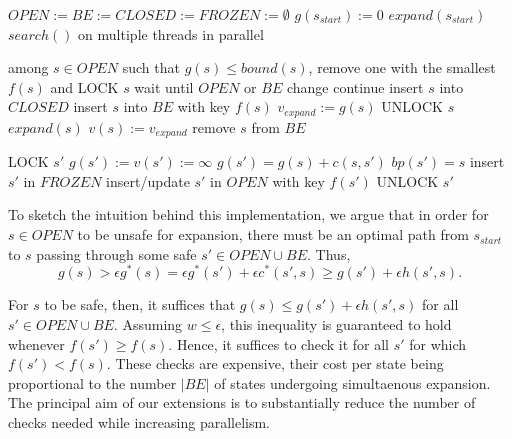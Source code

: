 \documentclass[letterpaper]{article}
\begin{document}
\begin{algorithm}
\caption{$main()$}
\label{alg:main}
\begin{algorithmic}
\STATE $OPEN := BE := CLOSED := FROZEN := \emptyset$
\STATE $g(s_{start}) := 0$
\STATE $expand(s_{start})$
\STATE $search()$ on multiple threads in parallel
\end{algorithmic}
\end{algorithm}

\begin{algorithm}
\caption{$search()$}
\label{alg:search}
\begin{algorithmic}
\STATE among $s\in OPEN$ such that $g(s) \le bound(s)$, remove one with the smallest $f(s)$ and LOCK $s$
\STATE wait until $OPEN$ or $BE$ change
\STATE continue
\ENDIF
\STATE insert $s$ into $CLOSED$
\STATE insert $s$ into $BE$ with key $f(s)$
\STATE $v_{expand} := g(s)$
\STATE UNLOCK $s$
\STATE $expand(s)$
\STATE $v(s) := v_{expand}$
\STATE remove $s$ from $BE$
\ENDWHILE
\end{algorithmic}
\end{algorithm}

\begin{algorithm}
\caption{$expand(s)$}
\label{alg:expand}
\begin{algorithmic}
\STATE LOCK $s'$
\STATE $g(s') := v(s') := \infty$
\ENDIF
{}
\STATE $g(s') = g(s) + c(s,s')$
\STATE $bp(s') = s$
\STATE insert $s'$ in $FROZEN$
\ELSE
\STATE insert/update $s'$ in $OPEN$ with key $f(s')$
\ENDIF
\ENDIF
\STATE UNLOCK $s'$
\ENDFOR
\end{algorithmic}
\end{algorithm}

To sketch the intuition behind this implementation, we argue that in order for $s\in OPEN$ to be unsafe for expansion, there must be an optimal path from $s_{start}$ to $s$ passing through some safe $s'\in OPEN\cup BE$. Thus,
\[g(s) > \epsilon g^*(s) = \epsilon g^*(s') + \epsilon c^*(s',s) \ge g(s') + \epsilon h(s',s).\]

For $s$ to be safe, then, it suffices that $g(s) \le g(s') + \epsilon h(s', s)$ for all $s'\in OPEN\cup BE$. Assuming $w \le \epsilon$, this inequality is guaranteed to hold whenever $f(s') \ge f(s)$. Hence, it suffices to check it for all $s'$ for which $f(s') < f(s)$. These checks are expensive, their cost per state being proportional to the number $|BE|$ of states undergoing simultaenous expansion. The principal aim of our extensions is to substantially reduce the number of checks needed while increasing parallelism.
\end{document}
